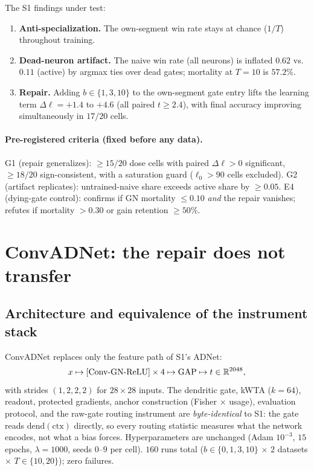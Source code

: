 \documentclass[review]{elsarticle}
\begin{document}
The S1 findings under test:

\begin{enumerate}
\item \textbf{Anti-specialization.} The own-segment win rate stays at
chance ($1/T$) throughout training.
\item \textbf{Dead-neuron artifact.} The naive win rate (all neurons)
is inflated $0.62$ vs.\ $0.11$ (active) by argmax ties over dead
gates; mortality at $T{=}10$ is $57.2\%$.
\item \textbf{Repair.} Adding $b \in \{1,3,10\}$ to the own-segment
gate entry lifts the learning term $\Delta\ell = +1.4$ to $+4.6$
(all paired $t \ge 2.4$), with final accuracy improving
simultaneously in $17/20$ cells.
\end{enumerate}

\paragraph{Pre-registered criteria (fixed before any data).}
G1 (repair generalizes): $\ge 15/20$ dose cells with paired
$\Delta\ell > 0$ significant, $\ge 18/20$ sign-consistent, with a
saturation guard ($\ell_0 > 90$ cells excluded). G2 (artifact
replicates): untrained-naive share exceeds active share by
$\ge 0.05$. E4 (dying-gate control): confirms if GN mortality
$\le 0.10$ \emph{and} the repair vanishes; refutes if mortality
$> 0.30$ or gain retention $\ge 50\%$.

\section{ConvADNet: the repair does not transfer}
\label{sec:conv}

\subsection{Architecture and equivalence of the instrument stack}

ConvADNet replaces only the feature path of S1's ADNet:
\[
x \mapsto [\mathrm{Conv}{\text -}\mathrm{GN}{\text -}\mathrm{ReLU}]
\times 4 \mapsto \mathrm{GAP} \mapsto t \in \mathbb{R}^{2048},
\]
with strides $(1,2,2,2)$ for $28{\times}28$ inputs. The dendritic
gate, kWTA ($k{=}64$), readout, protected gradients, anchor
construction (Fisher $\times$ usage), evaluation protocol, and the
raw-gate routing instrument are \emph{byte-identical} to S1: the gate
reads $\mathrm{dend}(\mathrm{ctx})$ directly, so every routing
statistic measures what the network encodes, not what a bias forces.
Hyperparameters are unchanged (Adam $10^{-3}$, $15$ epochs,
$\lambda{=}1000$, seeds $0$--$9$ per cell). $160$ runs total
($b \in \{0,1,3,10\}$ $\times$ $2$ datasets $\times$ $T \in
\{10,20\}$); zero failures.
\end{document}
